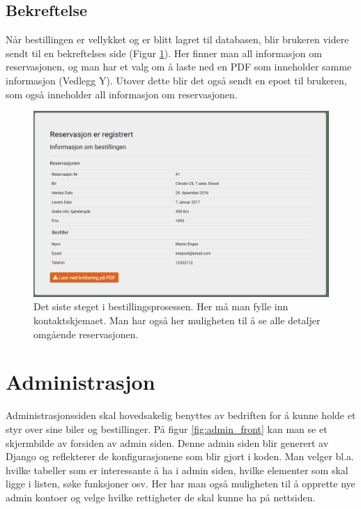 \subsection{Bekreftelse}
Når bestillingen er vellykket og er blitt lagret til databasen, blir brukeren videre sendt til en bekreftelses side (Figur \ref{fig:rv_customercontact}). Her finner man all informasjon om reservasjonen, og man har et valg om å laste ned en PDF som inneholder samme informasjon (Vedlegg Y). Utover dette blir det også sendt en epost til brukeren, som også inneholder all informasjon om reservasjonen.



 \begin{figure}[htbp]
	\centering
		\includegraphics[scale=0.5]{Bilder/rv_receipt.png}
	\caption[Ordre Bekreftelse]{Det siste steget i bestillingsprosessen. Her må man fylle inn kontaktskjemaet. Man har også her muligheten til å se alle detaljer omgående reservasjonen.} %
	\label{fig:rv_customercontact}
\end{figure}



\clearpage
\section{Administrasjon}
Administrasjonssiden skal hovedsakelig benyttes av bedriften for å kunne holde et styr over sine biler og bestillinger. På figur \ref{fig:admin_front} kan man se et skjermbilde av forsiden av admin siden. Denne admin siden blir generert av Django og reflekterer de konfigurasjonene som blir gjort i koden. Man velger bl.a. hvilke tabeller som er interessante å ha i admin siden, hvilke elementer som skal ligge i listen, søke funksjoner osv. Her har man også muligheten til å opprette nye admin kontoer og velge hvilke rettigheter de skal kunne ha på nettsiden.

